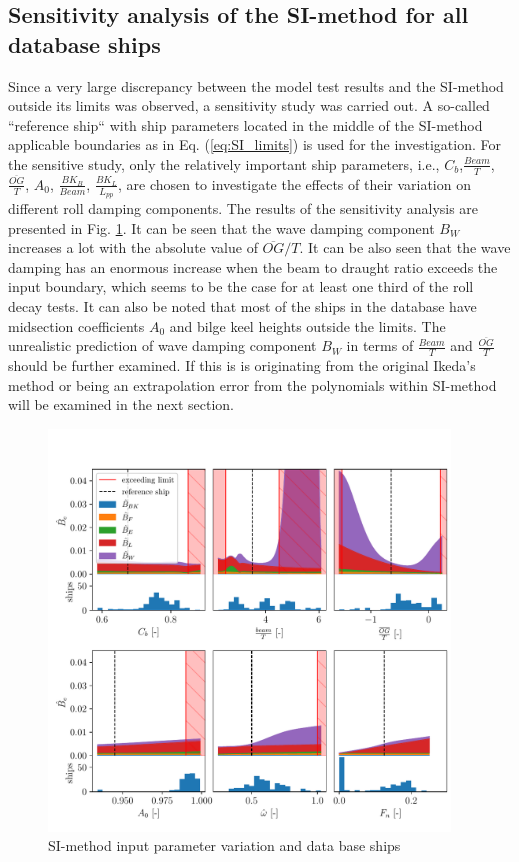 \subsection{Sensitivity analysis of the SI-method for all database ships}
\label{se:accuracy_SI_method}
Since a very large discrepancy between the model test results and the SI-method outside its limits was observed, a sensitivity study was carried out. A so-called ``reference ship`` with ship parameters located in the middle of the SI-method applicable boundaries as in Eq. (\ref{eq:SI_limits}) is used for the investigation. For the sensitive study, only the relatively important ship parameters, i.e., $C_b$,$\frac{Beam}{T}$, $\frac{\overline{OG}}{T}$, $A_0$, $\frac{BK_B}{Beam}$, $\frac{BK_L}{L_{pp}}$, are chosen to investigate the effects of their variation on different roll damping components. The results of the sensitivity analysis are presented in Fig. \ref{fig:SI_sensitivity}. It can be seen that the wave damping component $B_W$ increases a lot with the absolute value of $\overline{OG}/T$. It can be also seen that the wave damping has an enormous increase when the beam to draught ratio exceeds the input boundary, which seems to be the case for at least one third of the roll decay tests. It can also be noted that most of the ships in the database have midsection coefficients $A_0$ and bilge keel heights outside the limits. The unrealistic prediction of wave damping component $B_W$ in terms of $\frac{Beam}{T}$ and $\frac{\overline{OG}}{T}$ should be further examined. If this is is originating from the original Ikeda's method or being an extrapolation error from the polynomials within SI-method will be examined in the next section.

\begin{figure}[H]
    \centering
    \includegraphics[width=0.95\textwidth]{figures/SI-sensitivity.pdf}
        \vspace{-0.1cm}
    \caption{SI-method input parameter variation and data base ships}
    \label{fig:SI_sensitivity}
\end{figure}

